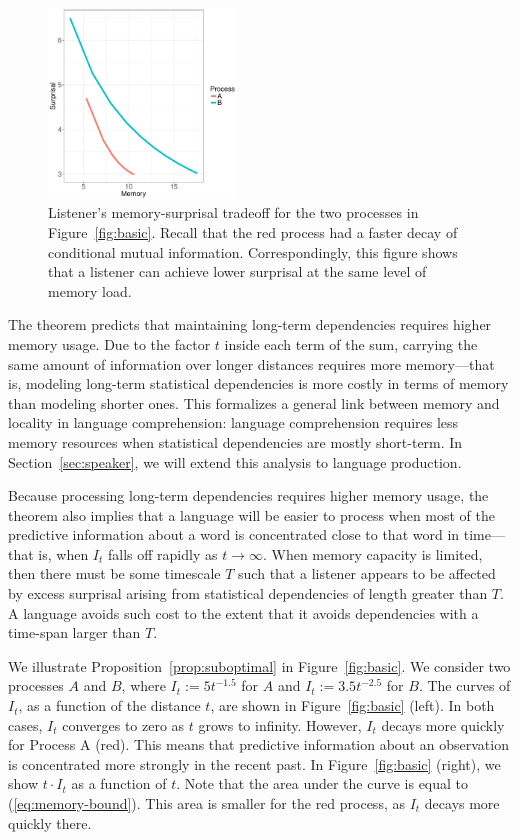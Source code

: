 \begin{figure}
\includegraphics[width=0.45\textwidth]{figures/listener-tradeoff.pdf}
	\caption{Listener's memory-surprisal tradeoff for the two processes in Figure~\ref{fig:basic}. Recall that the red process had a faster decay of conditional mutual information. Correspondingly, this figure shows that a listener can achieve lower surprisal at the same level of memory load.}\label{fig:listener-tradeoff}
\end{figure}

The theorem predicts that maintaining long-term dependencies requires higher memory usage. Due to the factor $t$ inside each term of the sum, carrying the same amount of information over longer distances requires more memory---that is, modeling long-term statistical dependencies is more costly in terms of memory than modeling shorter ones.
This formalizes a general link between memory and locality in language comprehension: language comprehension requires less memory resources when statistical dependencies are mostly short-term. 
In Section~\ref{sec:speaker}, we will extend this analysis to language production.

Because processing long-term dependencies requires higher memory usage, the theorem also implies that a language will be easier to process when most of the predictive information about a word is concentrated close to that word in time---that is, when $I_t$ falls off rapidly as $t \rightarrow \infty$. When memory capacity is limited, then there must be some timescale $T$ such that a listener appears to be affected by excess surprisal arising from statistical dependencies of length greater than $T$. A language avoids such cost to the extent that it avoids dependencies with a time-span larger than $T$.

We illustrate Proposition~\ref{prop:suboptimal} in Figure~\ref{fig:basic}.
We consider two processes $A$ and $B$, where $I_t := 5t^{-1.5}$ for $A$ and $I_t := 3.5 t^{-2.5}$ for $B$.
The curves of $I_t$, as a function of the distance $t$, are shown in Figure~\ref{fig:basic} (left).
In both cases, $I_t$ converges to zero as $t$ grows to infinity. 
However, $I_t$ decays more quickly for Process A (red).
This means that predictive information about an observation is concentrated more strongly in the recent past.
In Figure~\ref{fig:basic} (right), we show $t\cdot I_t$ as a function of $t$.
Note that the area under the curve is equal to (\ref{eq:memory-bound}).
This area is smaller for the red process, as $I_t$ decays more quickly there.  


